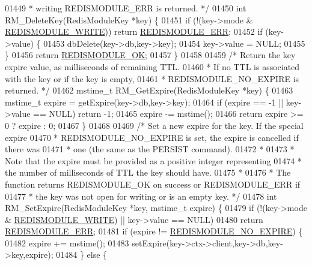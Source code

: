 \begin{DoxyCode}
{{{01449 \textcolor{comment}{ * writing REDISMODULE\_ERR is returned. */}
01450 \textcolor{keywordtype}{int} RM\_DeleteKey(RedisModuleKey *key) \{
01451     \textcolor{keywordflow}{if} (!(key->mode & \hyperlink{redismodule_8h_a73b37117ef94cb4a904361afcc51b6b4}{REDISMODULE\_WRITE})) \textcolor{keywordflow}{return} 
      \hyperlink{redismodule_8h_a3df6f5bd5247289e66f44437a7cddd49}{REDISMODULE\_ERR};
01452     \textcolor{keywordflow}{if} (key->value) \{
01453         dbDelete(key->db,key->key);
01454         key->value = NULL;
01455     \}
01456     \textcolor{keywordflow}{return} \hyperlink{redismodule_8h_a1bc5bfd69abcd378ff52c640adc5418d}{REDISMODULE\_OK};
01457 \}
01458 
01459 \textcolor{comment}{/* Return the key expire value, as milliseconds of remaining TTL.}
01460 \textcolor{comment}{ * If no TTL is associated with the key or if the key is empty,}
01461 \textcolor{comment}{ * REDISMODULE\_NO\_EXPIRE is returned. */}
01462 mstime\_t RM\_GetExpire(RedisModuleKey *key) \{
01463     mstime\_t expire = getExpire(key->db,key->key);
01464     \textcolor{keywordflow}{if} (expire == -1 || key->value == NULL) \textcolor{keywordflow}{return} -1;
01465     expire -= mstime();
01466     \textcolor{keywordflow}{return} expire >= 0 ? expire : 0;
01467 \}
01468 
01469 \textcolor{comment}{/* Set a new expire for the key. If the special expire}
01470 \textcolor{comment}{ * REDISMODULE\_NO\_EXPIRE is set, the expire is cancelled if there was}
01471 \textcolor{comment}{ * one (the same as the PERSIST command).}
01472 \textcolor{comment}{ *}
01473 \textcolor{comment}{ * Note that the expire must be provided as a positive integer representing}
01474 \textcolor{comment}{ * the number of milliseconds of TTL the key should have.}
01475 \textcolor{comment}{ *}
01476 \textcolor{comment}{ * The function returns REDISMODULE\_OK on success or REDISMODULE\_ERR if}
01477 \textcolor{comment}{ * the key was not open for writing or is an empty key. */}
01478 \textcolor{keywordtype}{int} RM\_SetExpire(RedisModuleKey *key, mstime\_t expire) \{
01479     \textcolor{keywordflow}{if} (!(key->mode & \hyperlink{redismodule_8h_a73b37117ef94cb4a904361afcc51b6b4}{REDISMODULE\_WRITE}) || key->value == NULL)
01480         \textcolor{keywordflow}{return} \hyperlink{redismodule_8h_a3df6f5bd5247289e66f44437a7cddd49}{REDISMODULE\_ERR};
01481     \textcolor{keywordflow}{if} (expire != \hyperlink{redismodule_8h_aa3f706d438eca2eca600845f5ee2e9b3}{REDISMODULE\_NO\_EXPIRE}) \{
01482         expire += mstime();
01483         setExpire(key->ctx->client,key->db,key->key,expire);
01484     \} \textcolor{keywordflow}{else} \{
}}}
\end{DoxyCode}

